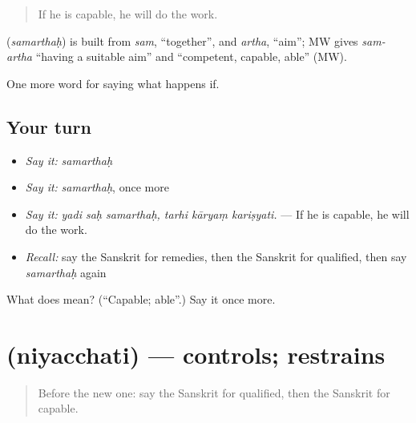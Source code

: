 \begin{quote}
If he is capable, he will do the work.
\end{quote}

\begin{cousinweb}
\textbf{} (\emph{samarthaḥ}) is built from \emph{sam}, \textquotedblleft{}together\textquotedblright{}, and \emph{artha}, \textquotedblleft{}aim\textquotedblright{}; MW gives \emph{sam-artha} \textquotedblleft{}having a suitable aim\textquotedblright{} and \textquotedblleft{}competent, capable, able\textquotedblright{} (MW).
\end{cousinweb}

\begin{grammarlens}[title={What you've built}]
One more word for saying what happens if.
\end{grammarlens}

\subsection*{Your turn}
\begin{itemize}
\raggedright
  \item \emph{Say it:} \emph{samarthaḥ}
  \item \emph{Say it:} \emph{samarthaḥ}, once more
  \item \emph{Say it:} \emph{yadi saḥ samarthaḥ, tarhi kāryaṃ kariṣyati.} — If he is capable, he will do the work.
  \item \emph{Recall:} say the Sanskrit for remedies, then the Sanskrit for qualified, then say \emph{samarthaḥ} again
\end{itemize}

\begin{tcolorbox}[breakable,colback=teal!4,colframe=teal!35!black,title={Before you move on}]
What does  mean? (\textquotedblleft{}Capable; able\textquotedblright{}.) Say it once more.
\end{tcolorbox}
\section[\texorpdfstring{\sk{नियच्छति} (niyacchati)}{नियच्छति (niyacchati)}]{ (niyacchati) — controls; restrains}

\label{lesson:SA-C376-niyacchati}



\begin{quote}
Before the new one: say the Sanskrit for qualified, then the Sanskrit for capable.
\end{quote}

